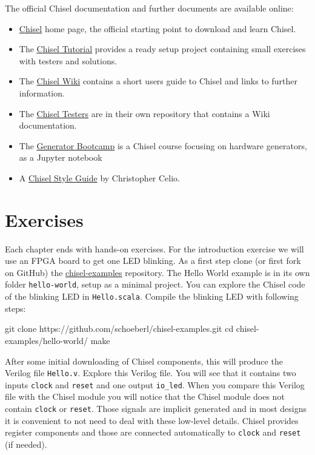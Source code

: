 \documentclass[%
    10pt, %
    headinclude, footexclude,
    openright, %
    notitlepage,
    cleardoubleempty,
    headsepline,
    pointlessnumbers,
    bibtotoc, idxtotoc,
    ]{scrbook}
\newcommand{\code}[1]{{\small{\texttt{#1}}}}
\newcommand{\myref}[2]{\href{#1}{#2}}
\begin{document}
The official Chisel documentation and further documents are available online:

\begin{itemize}
\item \myref{https://chisel.eecs.berkeley.edu/}{Chisel} home page, the official starting point to
download and learn Chisel.
\item The \myref{https://github.com/ucb-bar/chisel-tutorial}{Chisel Tutorial} provides a ready setup
project containing small exercises with testers and solutions.

\item The \myref{https://github.com/freechipsproject/chisel3/wiki}{Chisel Wiki} contains
a short users guide to Chisel and links to further information.
\item The \myref{https://github.com/freechipsproject/chisel-testers}{Chisel Testers} are in
their own repository that contains a Wiki documentation.
\item The \myref{https://github.com/ucb-bar/generator-bootcamp}{Generator Bootcamp} is
a Chisel course focusing on hardware generators, as a Jupyter notebook
\item A \myref{https://github.com/ccelio/chisel-style-guide}{Chisel Style Guide} by Christopher Celio.
\end{itemize}

\section{Exercises}

Each chapter ends with hands-on exercises. For the introduction exercise we will use an
FPGA board to get one LED blinking.
As a first step clone (or first fork on GitHub) the \myref{https://github.com/schoeberl/chisel-examples}{chisel-examples}
repository.
The Hello World example is in its own folder \code{hello-world}, setup as
a minimal project. You can explore the Chisel code of the blinking LED
in \code{Hello.scala}.
Compile the blinking LED with following steps:

\begin{chisel}
git clone https://github.com/schoeberl/chisel-examples.git
cd chisel-examples/hello-world/
make
\end{chisel}

After some initial downloading of Chisel components, this will produce the Verilog file \code{Hello.v}.
Explore this Verilog file. You will see that it contains two inputs \code{clock} and \code{reset}
and one output \code{io\_led}. When you compare this Verilog file with the Chisel module
you will notice that the Chisel module does not contain \code{clock} or \code{reset}.
Those signals are implicit generated and in most designs it is convenient to not need to
deal with these low-level details. Chisel provides register components and those
are connected automatically to \code{clock} and \code{reset} (if needed).
\end{document}
